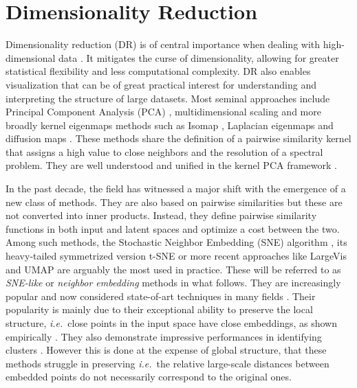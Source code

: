 \section{Dimensionality Reduction}\label{sec:background_dr}

Dimensionality reduction (DR) is of central importance when dealing with high-dimensional data \citep{donoho2000high}. It mitigates the curse of dimensionality, allowing for greater statistical flexibility and less computational complexity. DR also enables visualization that can be of great practical interest for understanding and interpreting the structure of large datasets.
Most seminal approaches include Principal Component Analysis (PCA) \cite{pearson1901liii},  multidimensional scaling \cite{kruskal1978multidimensional} and more broadly kernel eigenmaps methods such as Isomap \cite{balasubramanian2002isomap}, Laplacian eigenmaps \citep{belkin2003laplacian} and diffusion maps \citep{coifman2006diffusion}. These methods share the definition of a pairwise similarity kernel that assigns a high value to close neighbors and the resolution of a spectral problem. They are well understood and unified in the kernel PCA framework \citep{ham2004kernel}.

In the past decade, the field has witnessed a major shift with the emergence of a new class of methods. They are also based on pairwise similarities but these are not converted into inner products. Instead, they define pairwise similarity functions in both input and latent spaces and optimize a cost between the two. Among such methods, the Stochastic Neighbor Embedding (SNE) algorithm \cite{NIPS2002SNE}, its heavy-tailed symmetrized version t-SNE \cite{maaten2008tSNE} or more recent approaches like LargeVis \cite{tang2016visualizing} and UMAP \cite{mcinnes2018umap} are arguably the most used in practice. These will be referred to as \textit{SNE-like} or \textit{neighbor embedding} methods in what follows. They are increasingly popular and now considered state-of-art techniques in many fields \cite{li2017application,kobak2019art,anders2018dissecting}. Their popularity is mainly due to their exceptional ability to preserve the local structure, \textit{i.e.}\ close points in the input space have close embeddings, as shown empirically \cite{wang2021understanding}. They also demonstrate impressive performances in identifying clusters \cite{arora2018analysis, linderman2019clustering}. However this is done at the expense of global structure, that these methods struggle in preserving \cite{wattenberg2016use, coenen2019understanding} \textit{i.e.}\ the relative large-scale distances between embedded points do not necessarily correspond to the original ones.

